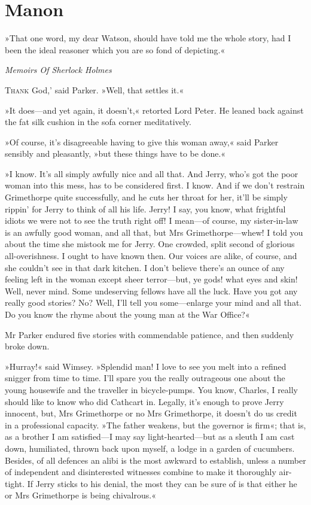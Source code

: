
\chapter{Manon}
\epigraph{»That one word, my dear Watson, should have told me the whole story, had I been the ideal reasoner which you are so fond of depicting.«}{\textit{Memoirs Of Sherlock Holmes}}

\lettrine[lines=4,ante=`]{T}{hank} God,' said Parker. »Well, that settles it.«

\zz
»It does—and yet again, it doesn't,« retorted Lord Peter. He leaned back against the fat silk cushion in the sofa corner meditatively.

»Of course, it's disagreeable having to give this woman away,« said Parker sensibly and pleasantly, »but these things have to be done.«

»I know. It's all simply awfully nice and all that. And Jerry, who's got the poor woman into this mess, has to be considered first. I know. And if we don't restrain Grimethorpe quite successfully, and he cuts her throat for her, it'll be simply rippin' for Jerry to think of all his life\textellipsis . Jerry! I say, you know, what frightful idiots we were not to see the truth right off! I mean—of course, my sister-in-law is an awfully good woman, and all that, but Mrs Grimethorpe—whew! I told you about the time she mistook me for Jerry. One crowded, split second of glorious all-overishness. I ought to have known then. Our voices are alike, of course, and she couldn't see in that dark kitchen. I don't believe there's an ounce of any feeling left in the woman except sheer terror—but, ye gods! what eyes and skin! Well, never mind. Some undeserving fellows have all the luck. Have you got any really good stories? No? Well, I'll tell you some—enlarge your mind and all that. Do you know the rhyme about the young man at the War Office?«

Mr Parker endured five stories with commendable patience, and then suddenly broke down.

»Hurray!« said Wimsey. »Splendid man! I love to see you melt into a refined snigger from time to time. I'll spare you the really outrageous one about the young housewife and the traveller in bicycle-pumps. You know, Charles, I really should like to know who did Cathcart in. Legally, it's enough to prove Jerry innocent, but, Mrs Grimethorpe or no Mrs Grimethorpe, it doesn't do us credit in a professional capacity. »The father weakens, but the governor is firm«; that is, as a brother I am satisfied—I may say light-hearted—but as a sleuth I am cast down, humiliated, thrown back upon myself, a lodge in a garden of cucumbers. Besides, of all defences an alibi is the most awkward to establish, unless a number of independent and disinterested witnesses combine to make it thoroughly air-tight. If Jerry sticks to his denial, the most they can be sure of is that either he or Mrs Grimethorpe is being chivalrous.«

